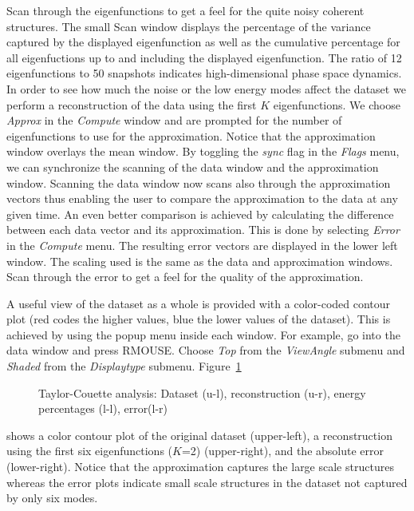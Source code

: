 Scan through the eigenfunctions to get a feel for the quite noisy
coherent structures. The small Scan window displays the percentage of 
the variance captured by the
displayed eigenfunction as well as
the cumulative percentage for all eigenfuctions
up to and including the displayed eigenfunction.
The ratio of 12 eigenfunctions to 50 snapshots indicates high-dimensional
phase space dynamics. In order to see how much the noise or the low
energy modes affect the dataset we
perform a reconstruction
of the data using the first $K$ eigenfunctions. We choose {\sl Approx} in the
{\sl Compute} window and are prompted for the number of eigenfunctions to use
for the approximation.
Notice that the
approximation window overlays the mean window. By toggling the {\sl 
sync} flag in the {\sl Flags} menu, we can synchronize the scanning of
the data window and the approximation window. Scanning the data window
now scans also through the approximation vectors thus enabling the
user to compare the approximation to the data at any given time. An even
better comparison is achieved by calculating the difference between 
each data vector and its approximation. This is done by selecting {\sl
Error} in the {\sl Compute} menu.  The resulting error 
vectors are displayed in the lower left window.  The scaling used is 
the same as the data and approximation windows.
Scan through the error to get a feel for the quality of
the approximation.

A useful view of the dataset as a whole is provided with a color-coded
contour plot (red codes the higher values, blue the lower values 
of the dataset). This is achieved by using the popup menu 
inside each window.  For example, go into the data window and press
RMOUSE.  Choose {\sl Top} from the {\sl ViewAngle} submenu and {\sl Shaded}
from the {\sl Displaytype} submenu.  Figure~\ref{fig:ct4}
\begin{figure}
\caption{Taylor-Couette analysis: Dataset (u-l), reconstruction (u-r),
energy percentages (l-l), error(l-r)}
\label{fig:ct4}
\end{figure} 
shows a
color contour plot of the original dataset (upper-left), a reconstruction
using the first six eigenfunctions ($K$=2) (upper-right), and the absolute
error (lower-right). Notice that the approximation captures the 
large scale structures whereas the  error plots indicate small scale 
structures in the dataset not captured by only six modes.

